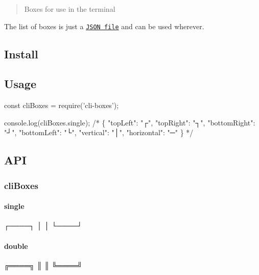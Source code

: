 \begin{quote}
Boxes for use in the terminal \end{quote}


The list of boxes is just a \href{boxes.json}{\tt J\+S\+ON file} and can be used wherever.

\subsection*{Install}




\subsection*{Usage}


\begin{DoxyCode}
const cliBoxes = require('cli-boxes');

console.log(cliBoxes.single);
/*
\{
    "topLeft": "┌",
    "topRight": "┐",
    "bottomRight": "┘",
    "bottomLeft": "└",
    "vertical": "│",
    "horizontal": "─"
\}
*/
\end{DoxyCode}


\subsection*{A\+PI}

\subsubsection*{cli\+Boxes}

\paragraph*{{\ttfamily single}}


\begin{DoxyCode}
┌────┐
│    │
└────┘
\end{DoxyCode}


\paragraph*{{\ttfamily double}}


\begin{DoxyCode}
╔════╗
║    ║
╚════╝
\end{DoxyCode}


